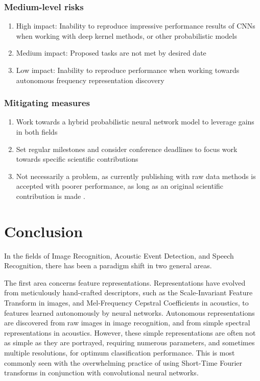 \documentclass[12pt]{llncs}
\begin{document}
\subsubsection{Medium-level risks} 
\begin{enumerate}
	\item High impact: Inability to reproduce impressive performance results of CNNs when working with deep kernel methods, or other probabilistic models
    \item Medium impact: Proposed tasks are not met by desired date
    \item Low impact: Inability to reproduce performance when working towards autonomous frequency representation discovery
\end{enumerate}
\subsubsection{Mitigating measures}
\begin{enumerate}
	\item Work towards a hybrid probabilistic neural network model to leverage gains in both fields
    \item Set regular milestones and consider conference deadlines to focus work towards specific scientific contributions
    \item Not necessarily a problem, as currently publishing with raw data methods is accepted with poorer performance, as long as an original scientific contribution is made \cite{dieleman2014end}.
\end{enumerate}


\section{Conclusion}
\label{sec:litreviewconclusion}
In the fields of Image Recognition, Acoustic Event Detection, and Speech Recognition, there has been a paradigm shift in two general areas. 

The first area concerns feature representations. Representations have evolved from meticulously hand-crafted descriptors, such as the Scale-Invariant Feature Transform in images, and  Mel-Frequency Cepstral Coefficients in acoustics, to features learned autonomously by neural networks. Autonomous representations are discovered from raw images in image recognition, and from simple spectral representations in acoustics. However, these simple representations are often not as simple as they are portrayed, requiring numerous parameters, and sometimes multiple resolutions, for optimum classification performance. This is most commonly seen with the overwhelming practice of using Short-Time Fourier transforms in conjunction with convolutional neural networks. 
\end{document}

